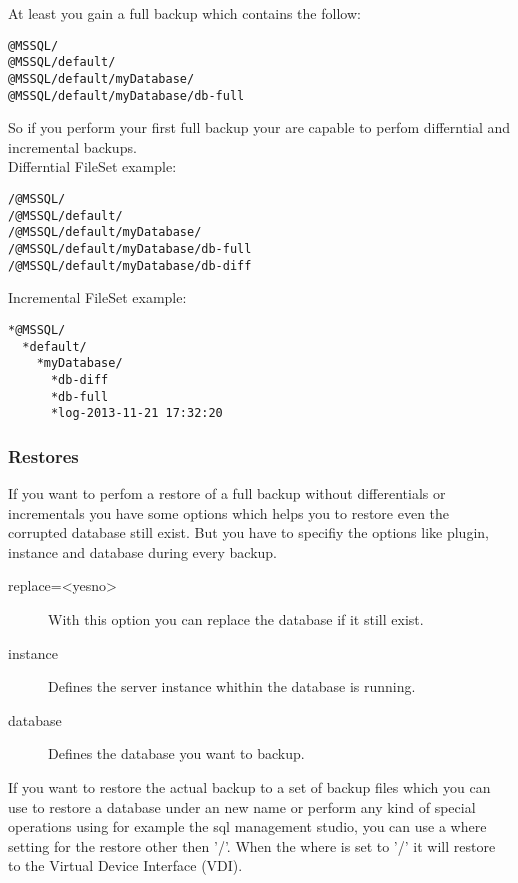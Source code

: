 At least you gain a full backup which contains the follow:

\footnotesize
\begin{verbatim}
@MSSQL/
@MSSQL/default/
@MSSQL/default/myDatabase/
@MSSQL/default/myDatabase/db-full
\end{verbatim}
\normalsize

So if you perform your first full backup your are capable to perfom differntial and incremental backups.\\

Differntial FileSet example:

\footnotesize
\begin{verbatim}
/@MSSQL/
/@MSSQL/default/
/@MSSQL/default/myDatabase/
/@MSSQL/default/myDatabase/db-full
/@MSSQL/default/myDatabase/db-diff
\end{verbatim}
\normalsize

Incremental FileSet example:

\footnotesize
\begin{verbatim}
*@MSSQL/
  *default/
    *myDatabase/
      *db-diff
      *db-full
      *log-2013-11-21 17:32:20
\end{verbatim}
\normalsize

\subsubsection{Restores}

If you want to perfom a restore of a full backup without differentials or incrementals you have
some options which helps you to restore even the corrupted database still exist.
But you have to specifiy the options like plugin, instance and database during every backup.

\begin{description}
  \item[replace=\textless yes{\textbar}no\textgreater]
  With this option you can replace the database if it still exist.
  \item[instance]
  Defines the server instance whithin the database is running.
  \item[database]
  Defines the database you want to backup.
\end{description}

If you want to restore the actual backup to a set of backup files which you can use to
restore a database under an new name or perform any kind of special operations using
for example the sql management studio, you can use a where setting for the restore
other then '/'. When the where is set to '/' it will restore to the Virtual Device Interface
(VDI).

